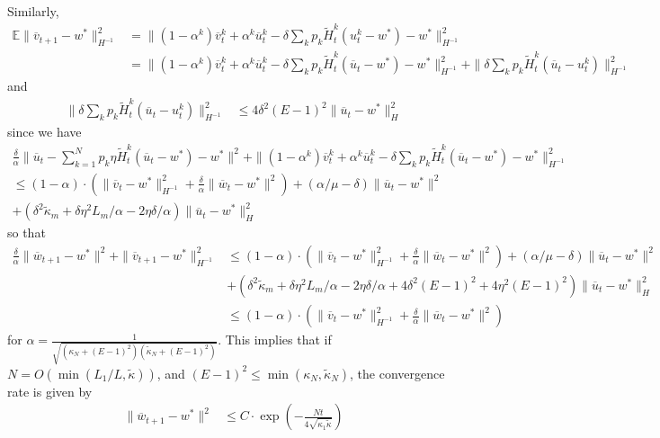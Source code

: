 Similarly, 
\begin{align*}
\mathbb{E}\|\overline{v}_{t+1}-w^{\ast}\|_{H^{-1}}^{2} & =\|(1-\alpha^{k})\overline{v}_{t}^{k}+\alpha^{k}\overline{u}_{t}^{k}-\delta\sum_{k}p_{k}\tilde{H}_{t}^{k}(u_{t}^{k}-w^{\ast})-w^{\ast}\|_{H^{-1}}^{2}\\
& =\|(1-\alpha^{k})\overline{v}_{t}^{k}+\alpha^{k}\overline{u}_{t}^{k}-\delta\sum_{k}p_{k}\tilde{H}_{t}^{k}(\overline{u}_{t}-w^{\ast})-w^{\ast}\|_{H^{-1}}^{2}+\|\delta\sum_{k}p_{k}\tilde{H}_{t}^{k}(\overline{u}_{t}-u_{t}^{k})\|_{H^{-1}}^{2}
\end{align*}
and 
\begin{align*}
\|\delta\sum_{k}p_{k}\tilde{H}_{t}^{k}(\overline{u}_{t}-u_{t}^{k})\|_{H^{-1}}^{2} & \leq4\delta^{2}(E-1)^{2}\|\overline{u}_{t}-w^{\ast}\|_{H}^{2}
\end{align*}
since we have 
\begin{align*}
\frac{\delta}{\alpha}\|\overline{u}_{t}-\sum_{k=1}^{N}p_{k}\eta\tilde{H}_{t}^{k}(\overline{u}_{t}-w^{\ast})-w^{\ast}\|^{2}+\|(1-\alpha^{k})\overline{v}_{t}^{k}+\alpha^{k}\overline{u}_{t}^{k}-\delta\sum_{k}p_{k}\tilde{H}_{t}^{k}(\overline{u}_{t}-w^{\ast})-w^{\ast}\|_{H^{-1}}^{2}\\
\leq(1-\alpha)\cdot(\|\overline{v}_{t}-w^{\ast}\|_{H^{-1}}^{2}+\frac{\delta}{\alpha}\|\overline{w}_{t}-w^{\ast}\|^{2})+(\alpha/\mu-\delta)\|\overline{u}_{t}-w^{\ast}\|^{2}\\
+(\delta^{2}\tilde{\kappa}_{m}+\delta\eta^{2}L_{m}/\alpha-2\eta\delta/\alpha)\|\overline{u}_{t}-w^{\ast}\|_{H}^{2}
\end{align*}
so that 
\begin{align*}
\frac{\delta}{\alpha}\|\overline{w}_{t+1}-w^{\ast}\|^{2}+\|\overline{v}_{t+1}-w^{\ast}\|_{H^{-1}}^{2} & \leq(1-\alpha)\cdot(\|\overline{v}_{t}-w^{\ast}\|_{H^{-1}}^{2}+\frac{\delta}{\alpha}\|\overline{w}_{t}-w^{\ast}\|^{2})+(\alpha/\mu-\delta)\|\overline{u}_{t}-w^{\ast}\|^{2}\\
& +(\delta^{2}\tilde{\kappa}_{m}+\delta\eta^{2}L_{m}/\alpha-2\eta\delta/\alpha+4\delta^{2}(E-1)^{2}+4\eta^{2}(E-1)^{2})\|\overline{u}_{t}-w^{\ast}\|_{H}^{2}\\
& \leq(1-\alpha)\cdot(\|\overline{v}_{t}-w^{\ast}\|_{H^{-1}}^{2}+\frac{\delta}{\alpha}\|\overline{w}_{t}-w^{\ast}\|^{2})
\end{align*}
for $\alpha=\frac{1}{\sqrt{(\kappa_{N}+(E-1)^{2})(\tilde{\kappa}_{N}+(E-1)^{2})}}$.
This implies that if $N=O(\min(L_{1}/L,\tilde{\kappa}))$, and $(E-1)^{2}\leq\min(\kappa_{N},\tilde{\kappa}_{N})$,
the convergence rate is given by 
\begin{align*}
\|\overline{w}_{t+1}-w^{\ast}\|^{2} & \leq C\cdot\exp(-\frac{Nt}{4\sqrt{\kappa_{1}\tilde{\kappa}}})
\end{align*}


